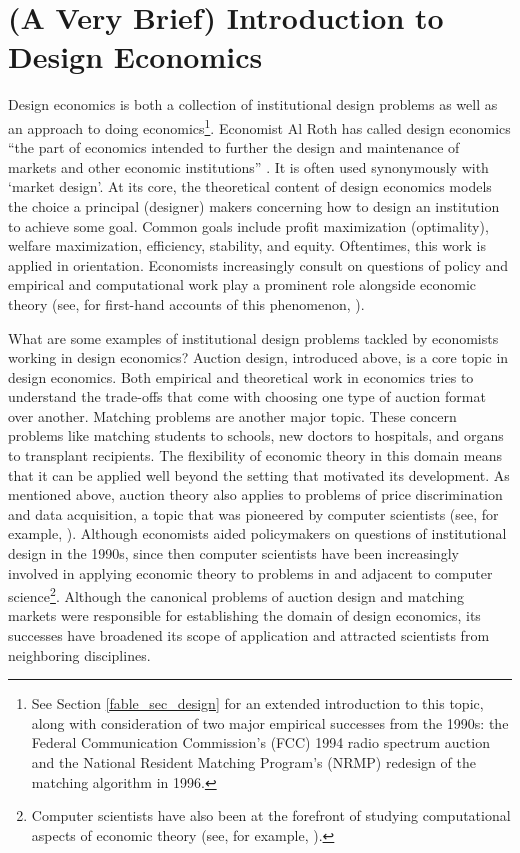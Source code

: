 \section{(A Very Brief) Introduction to Design Economics}\label{intro_sec_whatis}

Design economics is both a collection of institutional design problems as well as an approach to doing economics\footnote{See Section \ref{fable_sec_design} for an extended introduction to this topic, along with consideration of two major empirical successes from the 1990s: the Federal Communication Commission's (FCC) 1994 radio spectrum auction and the National Resident Matching Program's (NRMP) redesign of the matching algorithm in 1996.}. Economist Al Roth has called design economics ``the part of economics intended to further the design and maintenance of markets and other economic institutions'' \autocite[1341]{roth2002}. It is often used synonymously with `market design'. At its core, the theoretical content of design economics models the choice a principal (designer) makers concerning how to design an institution to achieve some goal. Common goals include profit maximization (optimality), welfare maximization, efficiency, stability, and equity. Oftentimes, this work is applied in orientation. Economists increasingly consult on questions of policy and empirical and computational work play a prominent role alongside economic theory (see, for first-hand accounts of this phenomenon, \cite{binmore2002, roth2019, sönmez2023minimalist}). 

What are some examples of institutional design problems tackled by economists working in design economics? Auction design, introduced above, is a core topic in design economics. Both empirical and theoretical work in economics tries to understand the trade-offs that come with choosing one type of auction format over another. Matching problems are another major topic. These concern problems like matching students to schools, new doctors to hospitals, and organs to transplant recipients. The flexibility of economic theory in this domain means that it can be applied well beyond the setting that motivated its development. As mentioned above, auction theory also applies to problems of price discrimination and data acquisition, a topic that was pioneered by computer scientists (see, for example, \cite{roth2012surveys, cai2015}). Although economists aided policymakers on questions of institutional design in the 1990s, since then computer scientists have been increasingly involved in applying economic theory to problems in and adjacent to computer science\footnote{Computer scientists have also been at the forefront of studying computational aspects of economic theory (see, for example, \cite{nisan2007algorithmic}).}. Although the canonical problems of auction design and matching markets were responsible for establishing the domain of design economics, its successes have broadened its scope of application and attracted scientists from neighboring disciplines.

